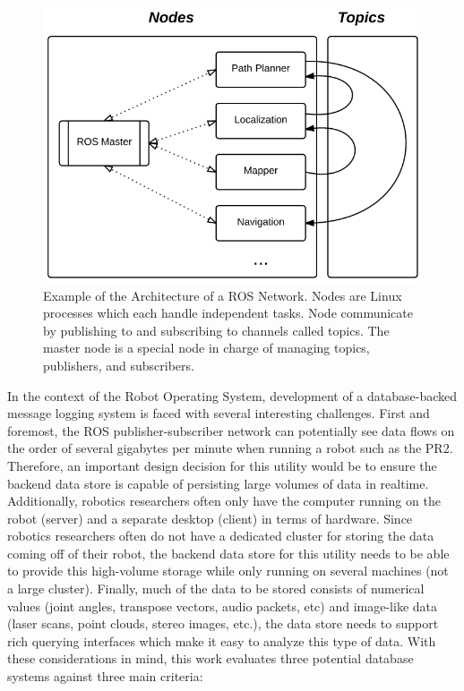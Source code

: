 \documentclass[nocopyrightspace]{acm_proc_article-sp}
\begin{document}
\begin{figure}
    \centering
    \includegraphics[width=\linewidth]{images/ros}
    \caption{Example of the Architecture of a ROS Network. Nodes are Linux processes which each handle independent tasks. Node communicate by publishing to and subscribing to channels called topics. The master node is a special node in charge of managing topics, publishers, and subscribers.}
    \label{fig:ros}
\end{figure}

In the context of the Robot Operating System, development of a database-backed message logging system is faced with several interesting challenges. First and foremost, the ROS publisher-subscriber network can potentially see data flows on the order of several gigabytes per minute when running a robot such as the PR2. Therefore, an important design decision for this utility would be to ensure the backend data store is capable of persisting large volumes of data in realtime. Additionally, robotics researchers often only have the computer running on the robot (server) and a separate desktop (client) in terms of hardware. Since robotics researchers often do not have a dedicated cluster for storing the data coming off of their robot, the backend data store for this utility needs to be able to provide this high-volume storage while only running on several machines (not a large cluster). Finally, much of the data to be stored consists of numerical values (joint angles, transpose vectors, audio packets, etc) and image-like data (laser scans, point clouds, stereo images, etc.), the data store needs to support rich querying interfaces which make it easy to analyze this type of data. With these considerations in mind, this work evaluates three potential database systems against three main criteria:
\end{document}
